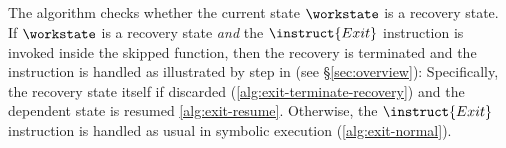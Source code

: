 \subsection{}

The algorithm checks whether the current state $\workstate$ is a
recovery state. If $\workstate$ is a recovery state \emph{and} the
$\instruct{Exit}$ instruction is invoked inside the skipped function,
then the recovery is terminated and the instruction is handled as
illustrated by step  in  (see
\S\ref{sec:overview}): Specifically, the recovery state itself if
discarded (\cref{alg:exit-terminate-recovery}) and the dependent state
is resumed \cref{alg:exit-resume}. Otherwise, the $\instruct{Exit}$
instruction is handled as usual in symbolic execution
(\cref{alg:exit-normal}).




